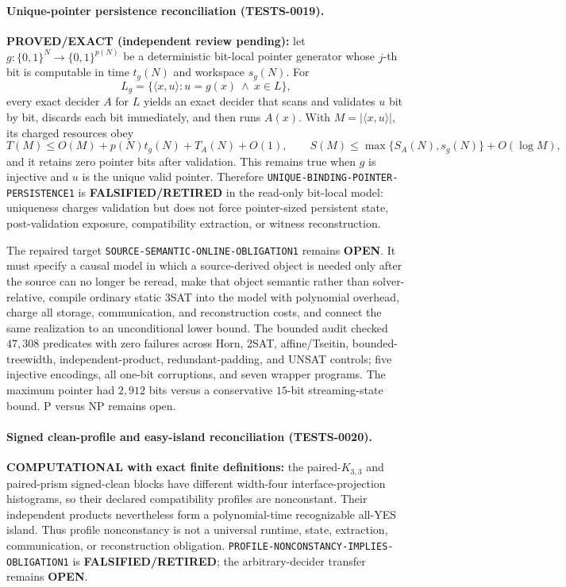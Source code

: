 \documentclass[11pt]{article}
\begin{document}
\paragraph{Unique-pointer persistence reconciliation (TESTS-0019).}
\textbf{PROVED/EXACT (independent review pending):} let
\(g:\{0,1\}^N\to\{0,1\}^{p(N)}\) be a deterministic bit-local pointer
generator whose \(j\)-th bit is computable in time \(t_g(N)\) and workspace
\(s_g(N)\).  For
\[
 L_g=\{\langle x,u\rangle:u=g(x)\ \land\ x\in L\},
\]
every exact decider \(A\) for \(L\) yields an exact decider that scans and
validates \(u\) bit by bit, discards each bit immediately, and then runs
\(A(x)\).  With \(M=|\langle x,u\rangle|\), its charged resources obey
\[
 T(M)\le O(M)+p(N)t_g(N)+T_A(N)+O(1),\qquad
 S(M)\le \max\{S_A(N),s_g(N)\}+O(\log M),
\]
and it retains zero pointer bits after validation.  This remains true when
\(g\) is injective and \(u\) is the unique valid pointer.  Therefore
\texttt{UNIQUE-BINDING-POINTER-PERSISTENCE1} is
\textbf{FALSIFIED/RETIRED} in the read-only bit-local model: uniqueness
charges validation but does not force pointer-sized persistent state,
post-validation exposure, compatibility extraction, or witness
reconstruction.

The repaired target \texttt{SOURCE-SEMANTIC-ONLINE-OBLIGATION1} remains
\textbf{OPEN}.  It must specify a causal model in which a source-derived
object is needed only after the source can no longer be reread, make that
object semantic rather than solver-relative, compile ordinary static 3SAT
into the model with polynomial overhead, charge all storage, communication,
and reconstruction costs, and connect the same realization to an
unconditional lower bound.  The bounded audit checked \(47{,}308\)
predicates with zero failures across Horn, 2SAT, affine/Tseitin,
bounded-treewidth, independent-product, redundant-padding, and UNSAT
controls; five injective encodings, all one-bit corruptions, and seven
wrapper programs.  The maximum pointer had \(2{,}912\) bits versus a
conservative \(15\)-bit streaming-state bound.  P versus NP remains open.



\paragraph{Signed clean-profile and easy-island reconciliation (TESTS-0020).}
\textbf{COMPUTATIONAL with exact finite definitions:} the paired-\(K_{3,3}\)
and paired-prism signed-clean blocks have different width-four
interface-projection histograms, so their declared compatibility profiles are
nonconstant.  Their independent products nevertheless form a polynomial-time
recognizable all-YES island.  Thus profile nonconstancy is not a universal
runtime, state, extraction, communication, or reconstruction obligation.
\texttt{PROFILE-NONCONSTANCY-IMPLIES-OBLIGATION1} is
\textbf{FALSIFIED/RETIRED}; the arbitrary-decider transfer remains
\textbf{OPEN}.
\end{document}
